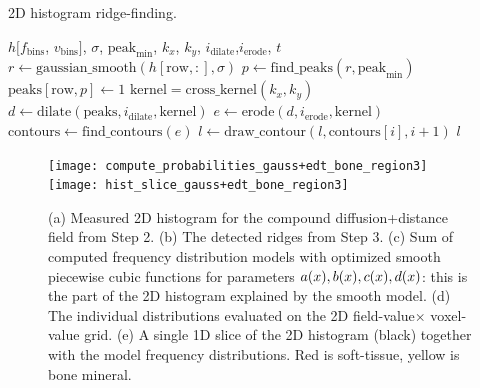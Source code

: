 \documentclass[pdflatex,sn-mathphys]{sn-jnl}%
\theoremstyle{thmstyleone}%
\theoremstyle{thmstyletwo}%
\theoremstyle{thmstylethree}%
\begin{document}
\begin{algorithm}
    \caption{2D histogram ridge-finding.}
    \label{alg:material}
    \begin{algorithmic}
         {$h[f_\text{bins}$, $v_\text{bins}]$, $\sigma$, $\text{peak}_\text{min}$, $k_x$, $k_y$, \newline \indent \indent $i_\text{dilate}$,$i_\text{erode}$, $t$}
                \State $r \gets \text{gaussian\_smooth}(h[\text{row},:], \sigma)$
                \State $p \gets \text{find\_peaks}(r, \text{peak}_\text{min})$
                \State $\text{peaks}[\text{row}, p] \gets 1$
            \EndFor
            \State $\text{kernel} = \text{cross\_kernel}(k_x, k_y)$
            \State $d \gets \text{dilate}(\text{peaks}, i_{\text{dilate}}, \text{kernel})$
            \State $e \gets \text{erode}(d, i_{\text{erode}}, \text{kernel})$
            \State $\text{contours} \gets \text{find\_contours}(e)$
                    \State $l \gets \text{draw\_contour}(l, \text{contours}[i], i+1)$
                \EndIf
            \EndFor
            \State \Return $l$
        \EndFunction
    \end{algorithmic}
\end{algorithm}

\begin{figure}
  \centering
  \texttt{[image: compute\_probabilities\_gauss+edt\_bone\_region3]}\\
  \texttt{[image: hist\_slice\_gauss+edt\_bone\_region3]}\\
  \caption{(a) Measured 2D histogram for the compound diffusion+distance field from Step 2. (b)
    The detected ridges from Step 3. (c) Sum of computed frequency distribution models
    with optimized smooth piecewise cubic functions for parameters $a(x), b(x), c(x), d(x)$:
    this is the part of the 2D histogram explained by the smooth model. (d) The individual distributions evaluated
    on the 2D field-value$\times$ voxel-value grid. (e) A single 1D slice of the 2D histogram (black) together with
    the model frequency distributions. Red is soft-tissue, yellow is bone mineral.
  }
  \label{fig:curves-and-more}
\end{figure}
\end{document}
